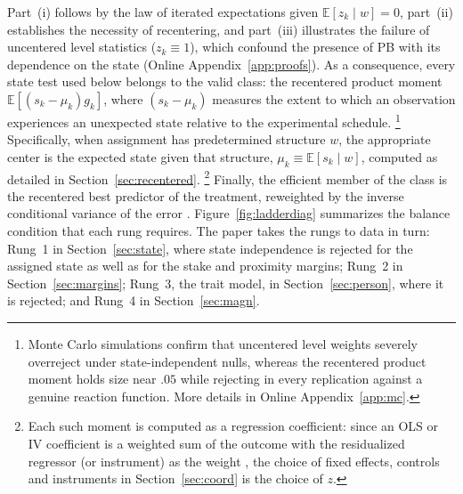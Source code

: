 \documentclass[11pt,a4paper]{article}
\theoremstyle{plain}
\theoremstyle{definition}
\begin{document}
\noindent
Part~(i) follows by the law of iterated expectations given $\mathbb{E}[z_k \mid w]=0$, part~(ii) establishes the necessity of recentering, %
and part~(iii) illustrates the failure of uncentered level statistics ($z_k \equiv 1$), which confound the presence of PB with its dependence on the state (Online Appendix~\ref{app:proofs}).
As a consequence, every state test used below belongs to the valid class: 
the recentered product moment $\mathbb{E}[(s_k-\mu_k) g_k]$, where $(s_k-\mu_k)$ measures the extent to which an observation experiences an unexpected state relative to the experimental schedule.%
\footnote{%
Monte Carlo simulations confirm that uncentered level weights severely overreject under state-independent nulls, whereas the recentered product moment holds size near $.05$ while rejecting in every replication against a genuine reaction function. %
More details in Online Appendix~\ref{app:mc}.} 
Specifically, when assignment has predetermined structure $w$, the appropriate center is the expected state given that structure, $\mu_k \equiv \mathbb{E}[s_k \mid w]$, computed as detailed in Section~\ref{sec:recentered}.%
\footnote{Each such moment is computed as a regression coefficient: 
since an OLS or IV coefficient is a weighted sum of the outcome \citep{frischwaugh1933,lovell1963} with the residualized regressor (or instrument) as the weight \citep{angristpischke2009}, the choice of fixed effects, controls and instruments in Section~\ref{sec:coord} is the choice of $z$.} 
Finally, the efficient member of the class is the recentered best predictor of the treatment, reweighted by the inverse conditional variance of the error \citep{borusyakhull2026}. %
Figure~\ref{fig:ladderdiag} summarizes the balance condition that each rung requires. 
The paper takes the rungs to data in turn: Rung~1 in Section~\ref{sec:state}, where state independence is rejected for the assigned state as well as for the stake and proximity margins; Rung~2 in Section~\ref{sec:margins}; Rung~3, the trait model, in Section~\ref{sec:person}, where it is rejected; and Rung~4 in Section~\ref{sec:magn}.
\end{document}
